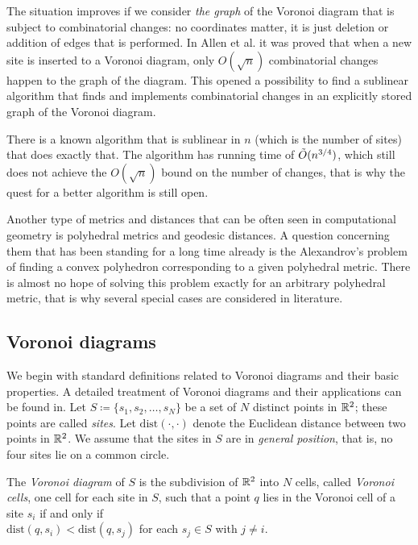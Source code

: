 \documentclass[a4paper,11pt]{article}
\begin{document}
The situation improves if we consider {\itshape the graph} of the Voronoi diagram that is subject to combinatorial changes: no coordinates matter, it is just deletion or addition of edges that is performed. In Allen et al. it was proved that when a new site is inserted to a Voronoi diagram, only $O(\sqrt{n})$ combinatorial changes happen to the graph of the diagram. This opened a possibility to find a sublinear algorithm that finds and implements combinatorial changes in an explicitly stored graph of the Voronoi diagram.

There is a known algorithm that is sublinear in $n$ (which is the number of sites) that does exactly that. The algorithm has running time of $\tilde{O} (n^{3/4})$, which still does not achieve the $O(\sqrt{n})$ bound on the number of changes, that is why the quest for a better algorithm is still open.

Another type of metrics and distances that can be often seen in computational geometry is polyhedral metrics and geodesic distances. A question concerning them that has been standing for a long time already is the Alexandrov's problem of finding a convex polyhedron corresponding to a given polyhedral metric. There is almost no hope of solving this problem exactly for an arbitrary polyhedral metric, that is why several special cases are considered in literature. 

\subsection{Voronoi diagrams}

We begin with standard definitions related to Voronoi diagrams and their basic properties. A detailed treatment of Voronoi diagrams and their applications can be found in. Let $S \coloneqq \{s_1, s_2, \ldots, s_N\}$ be a set of $N$ distinct points in $\mathbb R^2$; these points are called \emph{sites}. Let $\mathrm{dist} (\cdot, \cdot)$ denote the Euclidean distance between two points in  $\mathbb R^2$. We assume that the sites in $S$ are in {\itshape general position}, that is, no four sites lie on a common circle.

\begin{definition} The \emph{Voronoi diagram} of $S$ is the subdivision of $\mathbb R^2$ into $N$ {cells}, called \emph{Voronoi cells}, one cell for each site in $S$, such that a point $q$ lies in the Voronoi cell of a site $s_i$ if and only if \\
$\mathrm{dist} (q, s_i) < \mathrm{dist} (q, s_j)$ for each $s_j \in S$ with $j \ne i$. 
\end{definition}
\end{document}
